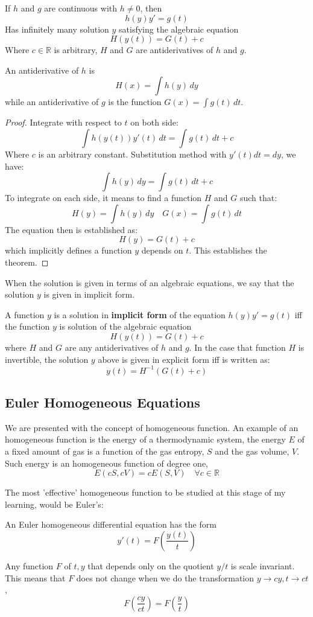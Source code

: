 \begin{theorem}
    If $h$ and $g$ are continuous with $h\neq 0$, then $$h(y)y'=g(t)$$
Has infinitely many solution $y$ satisfying the algebraic equation 
$$H(y(t))=G(t)+c$$
Where $c\in\mathbb{R}$ is arbitrary, $H$ and $G$ are antiderivatives of $h$ and $g$.
\end{theorem}
An antiderivative of $h$ is $$H(x)=\int h(y) \, dy $$
while an antiderivative of $g$ is the function $G(x)=\int g(t) \, dt$. 
\begin{proof}
    Integrate with respect to $t$ on both side: 
$$\int h(y(t))y'(t) \, dt = \int g(t) \, dt + c  $$
Where $c$ is an arbitrary constant. Substitution method with $y'(t)dt=dy$, we have: 
$$\int h(y) \, dy = \int g(t) \, dt +c $$
To integrate on each side, it means to find a function $H$ and $G$ such that: $$H(y)=\int h(y) \, dy\quad G(x)=\int g(t) \, dt  $$
The equation then is established as: $$H(y)=G(t)+c$$
which implicitly defines a function $y$ depends on $t$. This establishes the theorem. 
\end{proof}
When the solution is given in terms of an algebraic equations, we say that the solution $y$ is given in implicit form. 
\begin{theorem}
    A function $y$ is a solution in \textbf{implicit form} of the equation $h(y)y'=g(t)$ iff the function $y$ is solution of the algebraic equation $$H(y(t))=G(t)+c$$
where $H$ and $G$ are any antiderivatives of $h$ and $g$. In the case that function $H$ is invertible, the solution $y$ above is given in explicit form iff is written as: $$y(t)=H^{-1}(G(t)+c)$$
\end{theorem}
\subsection{Euler Homogeneous Equations}
We are presented with the concept of homogeneous function. An example of an homogeneous function is the energy of a thermodynamic system, the energy $E$ of a fixed amount of gas is a function of the gas entropy, $S$ and the gas volume, $V$. Such energy is an homogeneous function of degree one, $$E(cS,cV)=cE(S,V)\quad \forall c\in\mathbb{R}$$

The most 'effective' homogeneous function to be studied at this stage of my learning, would be Euler's:

\begin{definition}[Euler]
    An Euler homogeneous differential equation has the form $$y'(t)=F\left( \frac{y(t)}{t} \right)$$
\end{definition}
Any function $F$ of $t,y$ that depends only on the quotient $y/t$ is scale invariant. This means that $F$ does not change when we do the transformation $y\to cy,t\to ct$, $$F\left( \frac{cy}{ct} \right)=F\left( \frac{y}{t} \right)$$

